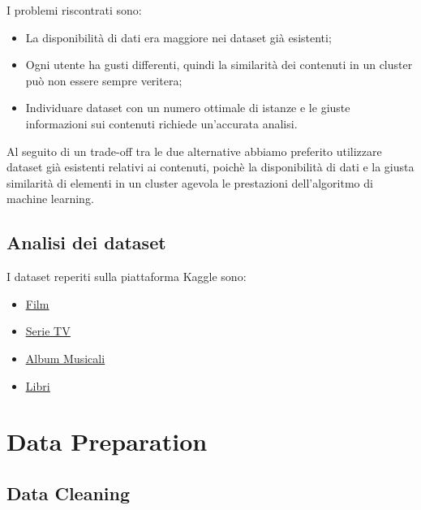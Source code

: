 \documentclass[a4paper, 12pt]{report}
\begin{document}
            I problemi riscontrati sono:
            \begin{itemize}
                \item La disponibilità di dati era maggiore nei dataset già esistenti;
                \item Ogni utente ha gusti differenti, quindi la similarità dei contenuti in un cluster può non essere sempre
                      veritera;
                \item Individuare dataset con un numero ottimale di istanze e le giuste informazioni sui contenuti richiede
                      un'accurata analisi.
            \end{itemize}
            Al seguito di un trade-off tra le due alternative abbiamo preferito utilizzare dataset già esistenti relativi ai contenuti,
            poichè la disponibilità di dati e la giusta similarità di elementi in un cluster agevola le prestazioni dell'algoritmo
            di machine learning.

        \section{Analisi dei dataset}\label{sec:analisi-dei-dataset}
            I dataset reperiti sulla piattaforma Kaggle sono:
            \begin{itemize}
                \item \href{https://www.kaggle.com/datasets/stefanoleone992/filmtv-movies-dataset?resource=download}{\underline{Film}}
                \item \href{https://www.kaggle.com/datasets/amritvirsinghx/web-series-ultimate-edition}{\underline{Serie TV}}
                \item \href{https://www.kaggle.com/datasets/lucascantu/top-5000-albums-of-all-time-spotify-features}{\underline{Album Musicali}}
                \item \href{https://www.kaggle.com/datasets/mdhamani/goodreads-books-100k}{\underline{Libri}}
            \end{itemize}



    \chapter{Data Preparation}\label{ch:data-preparation}


        \section{Data Cleaning}\label{sec:data-cleaning}
\end{document}
